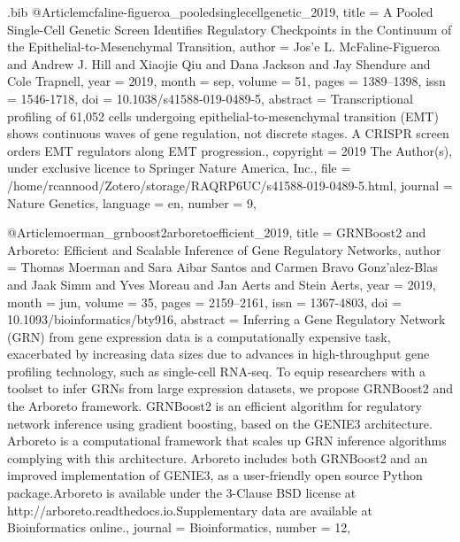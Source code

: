 \documentclass[
  table,
  10pt,
  a4paper]{article}
\begin{document}
\begin{filecontents}{\jobname.bib}
@Article{mcfaline-figueroa_pooledsinglecellgenetic_2019,
	title = {A Pooled Single-Cell Genetic Screen Identifies Regulatory Checkpoints in the Continuum of the Epithelial-to-Mesenchymal Transition},
	author = {Jos{\a'e} L. McFaline-Figueroa and Andrew J. Hill and Xiaojie Qiu and Dana Jackson and Jay Shendure and Cole Trapnell},
	year = {2019},
	month = {sep},
	volume = {51},
	pages = {1389--1398},
	issn = {1546-1718},
	doi = {10.1038/s41588-019-0489-5},
	abstract = {Transcriptional profiling of 61,052 cells undergoing epithelial-to-mesenchymal transition (EMT) shows continuous waves of gene regulation, not discrete stages. A CRISPR screen orders EMT regulators along EMT progression.},
	copyright = {2019 The Author(s), under exclusive licence to Springer Nature America, Inc.},
	file = {/home/rcannood/Zotero/storage/RAQRP6UC/s41588-019-0489-5.html},
	journal = {Nature Genetics},
	language = {en},
	number = {9},
}

@Article{moerman_grnboost2arboretoefficient_2019,
	title = {{{GRNBoost2}} and {{Arboreto}}: Efficient and Scalable Inference of Gene Regulatory Networks},
	author = {Thomas Moerman and Sara {Aibar Santos} and Carmen {Bravo Gonz{\a'a}lez-Blas} and Jaak Simm and Yves Moreau and Jan Aerts and Stein Aerts},
	year = {2019},
	month = {jun},
	volume = {35},
	pages = {2159--2161},
	issn = {1367-4803},
	doi = {10.1093/bioinformatics/bty916},
	abstract = {Inferring a Gene Regulatory Network (GRN) from gene expression data is a computationally expensive task, exacerbated by increasing data sizes due to advances in high-throughput gene profiling technology, such as single-cell RNA-seq. To equip researchers with a toolset to infer GRNs from large expression datasets, we propose GRNBoost2 and the Arboreto framework. GRNBoost2 is an efficient algorithm for regulatory network inference using gradient boosting, based on the GENIE3 architecture. Arboreto is a computational framework that scales up GRN inference algorithms complying with this architecture. Arboreto includes both GRNBoost2 and an improved implementation of GENIE3, as a user-friendly open source Python package.Arboreto is available under the 3-Clause BSD license at http://arboreto.readthedocs.io.Supplementary data are available at Bioinformatics online.},
	journal = {Bioinformatics},
	number = {12},
}


\end{filecontents}
\end{document}
